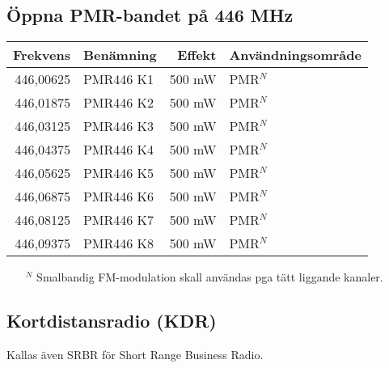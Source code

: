 \subsection{Öppna PMR-bandet på 446 MHz}
\begin{longtable}{rlrl}
\textbf{Frekvens} & \textbf{Benämning} & \textbf{Effekt} & \textbf{Användningsområde} \\ \hline \endhead
446,00625         & PMR446 K1          & 500 mW          & PMR$^N$                    \\
446,01875         & PMR446 K2          & 500 mW          & PMR$^N$                    \\
446,03125         & PMR446 K3          & 500 mW          & PMR$^N$                    \\
446,04375         & PMR446 K4          & 500 mW          & PMR$^N$                    \\
446,05625         & PMR446 K5          & 500 mW          & PMR$^N$                    \\
446,06875         & PMR446 K6          & 500 mW          & PMR$^N$                    \\
446,08125         & PMR446 K7          & 500 mW          & PMR$^N$                    \\
446,09375         & PMR446 K8          & 500 mW          & PMR$^N$
\end{longtable}

\footnotesize
\begin{itemize}
	\item[$^N$] Smalbandig FM-modulation skall användas pga tätt liggande kanaler.
\end{itemize}
\normalsize

\subsection{Kortdistansradio (KDR)}

Kallas även SRBR för Short Range Business Radio.


